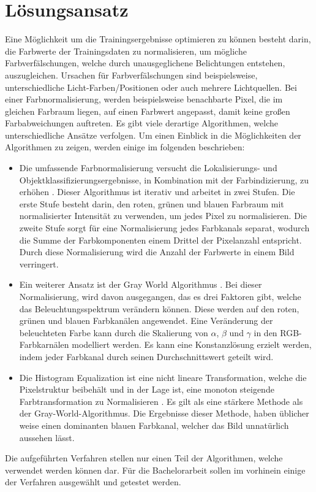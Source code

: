 \documentclass[a4paper,12pt,oneside]{article}
\begin{document}
  \section{Lösungsansatz}
Eine Möglichkeit um die Trainingsergebnisse optimieren zu können besteht darin, die Farbwerte der Trainingsdaten zu normalisieren, um mögliche Farbverfälschungen, welche durch unausgeglichene Belichtungen entstehen, auszugleichen. Ursachen für Farbverfälschungen sind beispielsweise, unterschiedliche Licht-Farben/Positionen oder auch mehrere Lichtquellen. Bei einer Farbnormalisierung, werden beispielsweise benachbarte Pixel, die im gleichen Farbraum liegen, auf einen Farbwert angepasst, damit keine großen Farbabweichungen auftreten. Es gibt viele derartige Algorithmen, welche unterschiedliche Ansätze verfolgen. Um einen Einblick in die Möglichkeiten der Algorithmen zu zeigen, werden einige im folgenden beschrieben:
  \begin{itemize}
  \item Die umfassende Farbnormalisierung versucht die Lokalisierungs- und Objektklassifizierungsergebnisse, in Kombination mit der Farbindizierung, zu erhöhen \cite{finlayson1998comprehensive}. Dieser Algorithmus ist iterativ und arbeitet in zwei Stufen. Die erste Stufe besteht darin, den roten, grünen und blauen Farbraum mit normalisierter Intensität zu verwenden, um jedes Pixel zu normalisieren. Die zweite Stufe sorgt für eine Normalisierung jedes Farbkanals separat, wodurch die Summe der Farbkomponenten einem Drittel der Pixelanzahl entspricht. Durch diese Normalisierung wird die Anzahl der Farbwerte in einem Bild verringert.
  \item Ein weiterer Ansatz ist der Gray World Algorithmus \cite{buenaposada2001variations}. Bei dieser Normalisierung, wird davon ausgegangen, das es drei Faktoren gibt, welche das Beleuchtungsspektrum verändern können. Diese werden auf den roten, grünen und blauen Farbkanälen angewendet. Eine Veränderung der beleuchteten Farbe kann durch die Skalierung von $\alpha$, $\beta$ und $\gamma$ in den RGB-Farbkarnälen modelliert werden. Es kann eine Konstanzlösung erzielt werden, indem jeder Farbkanal durch seinen Durchschnittswert geteilt wird.
  \item Die Histogram Equalization ist eine nicht lineare Transformation, welche die Pixelstruktur beibehält und in der Lage ist, eine monoton steigende Farbtransformation zu Normalisieren \cite{goatman2003colour}. Es gilt als eine stärkere Methode als der Gray-World-Algorithmus. Die Ergebnisse dieser Methode, haben üblicher weise einen dominanten blauen Farbkanal, welcher das Bild unnatürlich aussehen lässt.
  \end{itemize}
Die aufgeführten Verfahren stellen nur einen Teil der Algorithmen, welche verwendet werden können dar. Für die Bachelorarbeit sollen im vorhinein einige der Verfahren ausgewählt und getestet werden.
\end{document}
